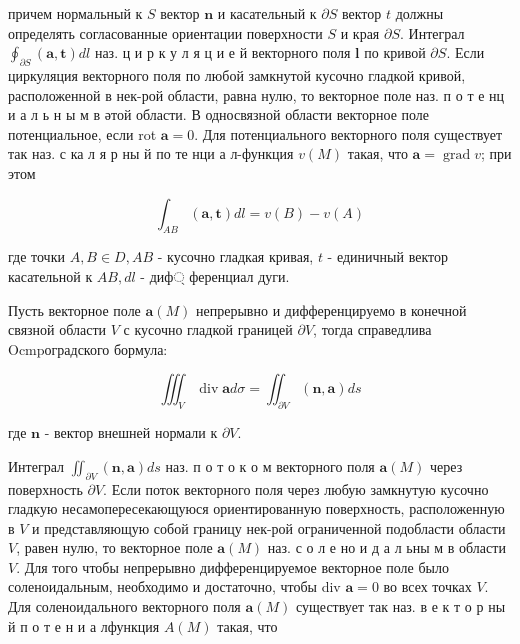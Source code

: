 \documentclass[10pt]{article}
\begin{document}
причем нормальный к $S$ вектор $\boldsymbol{n}$ и касательный к $\partial S$ вектор $t$ должны определять согласованные ориентации поверхности $S$ и края $\partial S$. Интеграл $\oint_{\partial S}(\boldsymbol{a}, \boldsymbol{t}) d l$ наз. ц и р к у л я ц и е й векторного поля $\boldsymbol{l}$ по кривой $\partial S$. Если циркуляция векторного поля по любой замкнутой кусочно гладкой кривой, расположенной в нек-рой области, равна нулю, то векторное поле наз. п о т е нц и а л ь н ы м в әтой области. В односвязной области векторное поле потенциальное, если rot $\boldsymbol{a}=0$. Для потенциального векторного поля существует так наз. с ка л я р ны й по те нци а л-функция $v(M)$ такая, что $\boldsymbol{a}=\operatorname{grad} v$; при этом



\[

\int_{A B}(\boldsymbol{a}, \boldsymbol{t}) d l=v(B)-v(A)

\]



где точки $A, B \in D, A B$ - кусочно гладкая кривая, $t$ - единичный вектор касательной к $A B, d l$ - диф্ ференциал дуги.



Пусть векторное поле $\boldsymbol{a}(M)$ непрерывно и дифференцируемо в конечной связной области $V$ с кусочно гладкой границей $\partial V$, тогда справедлива Ocmpоградского бормула:



\[

\iiint_{V} \operatorname{div} \boldsymbol{a} d \sigma=\iint_{\partial V}(\boldsymbol{n}, \boldsymbol{a}) d s

\]



где $\boldsymbol{n}$ - вектор внешней нормали к $\partial V$.



Интеграл $\iint_{\partial V}(\boldsymbol{n}, \boldsymbol{a}) d s$ наз. п о т о к о м векторного поля $\boldsymbol{a}(M)$ через поверхность $\partial V$. Если поток векторного поля через любую замкнутую кусочно гладкую несамопересекающуюся ориентированную поверхность, расположенную в $V$ и представляющую собой границу нек-рой ограниченной подобласти области $V$, равен нулю, то векторное поле $\boldsymbol{a}(M)$ наз. с о л е но и д а л ьны м в области $V$. Для того чтобы непрерывно дифференцируемое векторное поле было соленоидальным, необходимо и достаточно, чтобы div $\boldsymbol{a}=0$ во всех точках $V$. Для соленоидального векторного поля $\boldsymbol{a}(M)$ существует так наз. в е к т о р ны й п о т е н и а лфункция $A(M)$ такая, что
\end{document}
